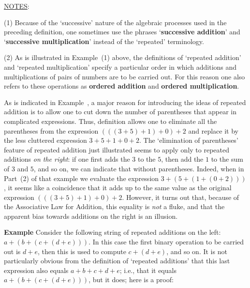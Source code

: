 {\V
\V
        
        \underline{NOTES}:

\V

        (1) Because of the `successive' nature of the algebraic processes used in the preceding definition,
    one sometimes use the phrases `{\bf successive addition}' and `{\bf successive multiplication}' instead of the `repeated' terminology.

\V

        (2) As is illustrated in Example~(1) above, the definitions of `repeated addition' and `repeated multiplication' specify a particular order in which additions and multiplications of pairs of numbers are to be carried out. 
    For this reason one also refers to these operations as {\bf ordered addition} and {\bf ordered multiplication}.


    
\V
\V

        As is indicated in Example~, a major reason for introducing the ideas of repeated addition is to allow one to cut down the number of parentheses that appear in complicated expressions.
    Thus, definition allows one to eliminate all the parentheses from the expression $(((3+5)+1)+0)+2$ and replace it by the less cluttered expression $3 + 5 + 1 + 0 + 2$.
    The `elimination of parentheses' feature of repeated addition just illustrated seems to apply only to repeated additions {\em on the right}:
    if one first adds the $3$ to the $5$, then add the $1$ to the sum of $3$ and $5$, and so on, we can indicate that without parentheses.
    Indeed, when in Part~(2) of that example we evaluate the expression $3+(5+(1+(0+2)))$,
    it seems like a coincidence that it adds up to the same value as the original expression $(((3+5)+1)+0)+2$.
    However, it turns out that, because of the Associative Law for Addition, this equality is {\em not} a fluke,
    and that the apparent bias towards additions on the right is an illusion.


\V
        {\bf Example} Consider the following string of repeated additions on the left: $a+(b+(c+(d+e)))$.
    In this case the first binary operation to be carried out is $d+e$, then this is used to compute $c+(d+e)$, and so on.
    It is not particularly obvious from the definition of `repeated additions' that this last expression also equals $a+b+c+d+e$;
    i.e., that it equals $a+(b+(c+(d+e)))$, but it does; here is a proof:

}
